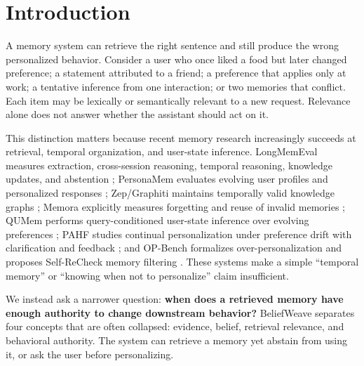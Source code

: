 \documentclass[10pt]{article}
\begin{document}
\section{Introduction}
A memory system can retrieve the right sentence and still produce the wrong personalized behavior. Consider a user who once liked a food but later changed preference; a statement attributed to a friend; a preference that applies only at work; a tentative inference from one interaction; or two memories that conflict. Each item may be lexically or semantically relevant to a new request. Relevance alone does not answer whether the assistant should act on it.

This distinction matters because recent memory research increasingly succeeds at retrieval, temporal organization, and user-state inference. LongMemEval measures extraction, cross-session reasoning, temporal reasoning, knowledge updates, and abstention \cite{wu2025longmemeval}; PersonaMem evaluates evolving user profiles and personalized responses \cite{jiang2025personamem}; Zep/Graphiti maintains temporally valid knowledge graphs \cite{rasmussen2025zep}; Memora explicitly measures forgetting and reuse of invalid memories \cite{uddin2026memora}; QUMem performs query-conditioned user-state inference over evolving preferences \cite{wang2026qumem}; PAHF studies continual personalization under preference drift with clarification and feedback \cite{liang2026pahf}; and OP-Bench formalizes over-personalization and proposes Self-ReCheck memory filtering \cite{hu2026opbench}. These systems make a simple ``temporal memory'' or ``knowing when not to personalize'' claim insufficient.

We instead ask a narrower question: \textbf{when does a retrieved memory have enough authority to change downstream behavior?} BeliefWeave separates four concepts that are often collapsed: evidence, belief, retrieval relevance, and behavioral authority. The system can retrieve a memory yet abstain from using it, or ask the user before personalizing.
\end{document}

